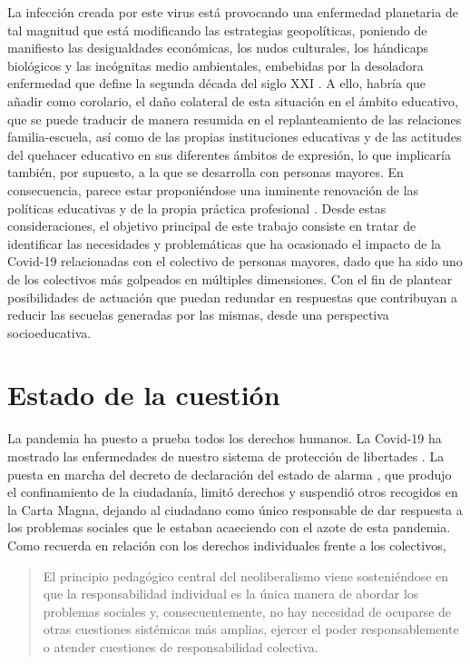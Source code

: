 \documentclass{textolivre}
\begin{document}
La infección creada por este virus está provocando una enfermedad planetaria de tal magnitud que está modificando las estrategias geopolíticas, poniendo de manifiesto las desigualdades económicas, los nudos culturales, los hándicaps biológicos y las incógnitas medio ambientales, embebidas por la desoladora enfermedad que define la segunda década del siglo XXI \cite{lunanemecio2020}. %
A ello, habría que añadir como corolario, el daño colateral de esta situación en el ámbito educativo, que se puede traducir de manera resumida en el replanteamiento de las relaciones familia-escuela, así como de las propias instituciones educativas y de las actitudes del quehacer educativo en sus diferentes ámbitos de expresión, lo que implicaría también, por supuesto, a la que se desarrolla con personas mayores. En consecuencia, parece estar proponiéndose una inminente renovación de las políticas educativas y de la propia práctica profesional \cite{bolivar2020}. %
Desde estas consideraciones, el objetivo principal  de este trabajo consiste en tratar de identificar las necesidades y problemáticas que ha ocasionado el impacto de la Covid-19 relacionadas con el colectivo de personas mayores, dado que ha sido uno de los colectivos más golpeados en múltiples dimensiones. Con el fin de plantear posibilidades de actuación que puedan redundar en respuestas que contribuyan a reducir las secuelas generadas por las mismas, desde una perspectiva socioeducativa.

\section{Estado de la cuestión}
La pandemia ha puesto a prueba todos los derechos humanos. La Covid-19 ha mostrado las enfermedades de nuestro sistema de protección de libertades \cite{montalvo2020}. %
La puesta en marcha del decreto de declaración del estado de alarma \cite{realdecreto}, %
que produjo el confinamiento de la ciudadanía, limitó derechos y suspendió otros recogidos en la Carta Magna, dejando al ciudadano como único responsable de dar respuesta a los problemas sociales que le estaban acaeciendo con el azote de esta pandemia. Como recuerda \textcite[p. 1]{giroux2020} %
en relación con los derechos individuales frente a los colectivos,

\begin{quote}
    El principio pedagógico central del neoliberalismo viene sosteniéndose en que la responsabilidad individual es la única manera de abordar los problemas sociales y, consecuentemente, no hay necesidad de ocuparse de otras cuestiones sistémicas más amplias, ejercer el poder responsablemente o atender cuestiones de responsabilidad colectiva.
\end{quote}
\end{document}
